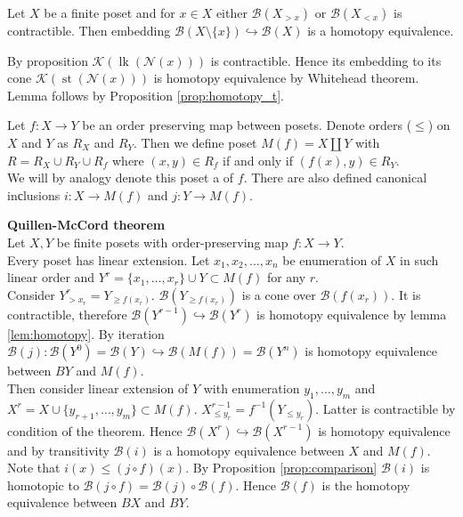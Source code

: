 \begin{lemma}
  \label{lem:homotopy}
  Let $X$ be a finite poset and for $x \in X$ either $\mathcal{B}(X_{>x})$ or $\mathcal{B}(X_{<x})$ is contractible. Then embedding $\mathcal{B}(X \setminus \{x\}) \hookrightarrow \mathcal{B}(X)$ is a homotopy equivalence.
\end{lemma}

\begin{pf}
  By proposition $\mathcal{K}(\operatorname{lk}(\mathcal{N}(x)))$ is contractible. Hence its embedding to its cone $\mathcal{K}(\operatorname{st}(\mathcal{N}(x)))$ is homotopy equivalence by Whitehead theorem. Lemma follows by Proposition \ref{prop:homotopy_t}.
\end{pf}

\begin{definition}
  Let $f : X \to Y$ be an order preserving map between posets. Denote orders ($\leq$) on $X$ and $Y$ as $R_X$ and $R_Y$. Then we define poset $M(f) = X \coprod Y$ with $R = R_X \cup R_Y \cup R_{f}$ where $(x,y) \in R_f$ if and only if $(f(x),y) \in R_Y$.\\

  We will by analogy denote this poset a  of $f$. There are also defined canonical inсlusions $i : X \to M(f)$ and $j : Y \to M(f)$.
\end{definition}

\begin{pf} \textbf{Quillen-McCord theorem}\\
  Let $X, Y$ be finite posets with order-preserving map $f : X \to Y$.\\

  Every poset has linear extension. Let $x_1, x_2, \ldots, x_n$ be enumeration of $X$ in such linear order and $Y^r = \{x_1,\ldots,x_r\} \cup Y \subset M(f)$ for any $r$.\\

  Consider $Y^r_{>x_r} = Y_{\geq f(x_r)}$. $\mathcal{B}(Y_{\geq f(x_r)})$ is a cone over $\mathcal{B}(f(x_r))$. It is contractible, therefore $\mathcal{B}(Y^{r-1}) \hookrightarrow \mathcal{B}(Y^{r})$ is homotopy equivalence by lemma \ref{lem:homotopy}. By iteration $\mathcal{B}(j) : \mathcal{B}(Y^{0}) = \mathcal{B}(Y) \hookrightarrow \mathcal{B}(M(f)) = \mathcal{B}(Y^n)$ is homotopy equivalence between $BY$ and $M(f)$.\\

  Then consider linear extension of $Y$ with enumeration $y_1,\ldots,y_m$ and $X^r = X \cup \{y_{r+1},\ldots,y_m\} \subset M(f)$. $X^{r-1}_{\leq y_r} = f^{-1}(Y_{\leqslant y_r})$. Latter is contractible by condition of the theorem. Hence $\mathcal{B}(X^{r}) \hookrightarrow \mathcal{B}(X^{r-1})$ is homotopy equivalence and by transitivity $\mathcal{B}(i)$ is a homotopy equivalence between $X$ and $M(f)$.\\

  Note that $i(x) \leqslant (j \circ f)(x)$. By Proposition \ref{prop:comparison} $\mathcal{B}(i)$ is homotopic to $\mathcal{B}(j \circ f) = \mathcal{B}(j) \circ \mathcal{B}(f)$. Hence $\mathcal{B}(f)$ is the homotopy equivalence between $BX$ and $BY$.
\end{pf}
